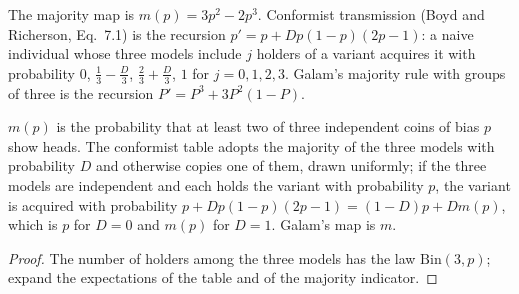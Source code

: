 \begin{definition}\label{def:majority-map}
\leanok
The majority map is $m(p)=3p^2-2p^3$. Conformist transmission (Boyd and Richerson, Eq.~7.1) is the
recursion $p'=p+Dp(1-p)(2p-1)$: a naive individual whose three models include $j$ holders of a
variant acquires it with probability $0$, $\frac13-\frac D3$, $\frac23+\frac D3$, $1$ for
$j=0,1,2,3$. Galam's majority rule with groups of three is the recursion $P'=P^3+3P^2(1-P)$.
\end{definition}
\begin{lemma}\label{lem:majority-map}
\leanok{}
$m(p)$ is the probability that at least two of three independent coins of bias $p$ show heads. The
conformist table adopts the majority of the three models with probability $D$ and otherwise
copies one of them, drawn uniformly; if the three models are independent and each holds the
variant with probability $p$, the variant is acquired with probability $p+Dp(1-p)(2p-1)
=(1-D)p+Dm(p)$, which is $p$ for $D=0$ and $m(p)$ for $D=1$. Galam's map is $m$.
\end{lemma}
\begin{proof}\leanok
The number of holders among the three models has the law $\mathrm{Bin}(3,p)$; expand the
expectations of the table and of the majority indicator.
\end{proof}
